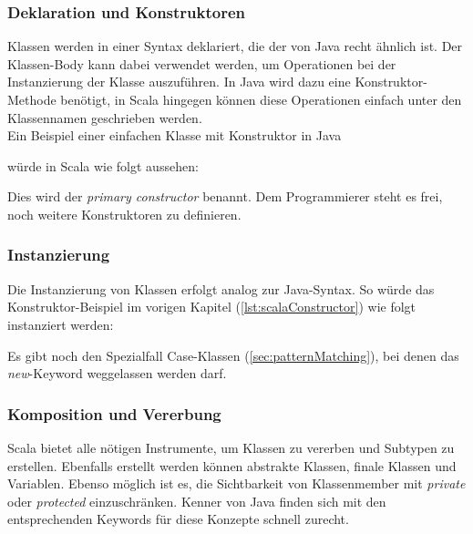 \subsubsection{Deklaration und Konstruktoren}

Klassen werden in einer Syntax deklariert, die der von Java recht
ähnlich ist. Der Klassen-Body kann dabei verwendet werden,
um Operationen bei der Instanzierung der Klasse auszuführen. In Java
wird dazu eine Konstruktor-Methode benötigt, in Scala hingegen können
diese Operationen einfach unter den Klassennamen geschrieben werden. \\

Ein Beispiel einer einfachen Klasse mit Konstruktor in Java


würde in Scala wie folgt aussehen:


Dies wird der \emph{primary constructor} benannt. Dem Programmierer steht es 
frei, noch weitere Konstruktoren zu definieren.


\subsubsection{Instanzierung}

Die Instanzierung von Klassen erfolgt analog zur Java-Syntax. So würde das 
Konstruktor-Beispiel im vorigen Kapitel (\ref{lst:scalaConstructor}) wie 
folgt instanziert werden:



Es gibt noch den Spezialfall Case-Klassen (\ref{sec:patternMatching}),
bei denen das \emph{new}-Keyword weggelassen werden darf.

\subsubsection{Komposition und Vererbung}

Scala bietet alle nötigen Instrumente, um Klassen zu vererben und Subtypen
zu erstellen. Ebenfalls erstellt werden können abstrakte Klassen, finale
Klassen und Variablen. Ebenso möglich ist es, die Sichtbarkeit von 
Klassenmember mit \emph{private} oder \emph{protected} einzuschränken. 
Kenner von Java finden sich mit den entsprechenden Keywords für diese
Konzepte schnell zurecht.\\

